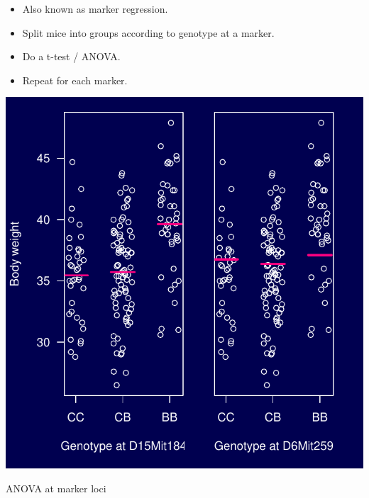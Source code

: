 \documentclass[12pt]{article}
\newcommand{\headsize}{\fontsize{35}{35} \selectfont}
\newcommand{\smallersize}{\fontsize{20}{25} \selectfont}
\begin{document}
\hspace*{0.5in}
\begin{minipage}[t]{4.1in}
\vspace*{5mm}

\sloppy
\smallersize
\begin{itemize}
\setlength{\rightskip}{0pt plus 1fil} %
\item Also known as {\color{mypink} marker regression}.
\item Split mice into groups according to genotype at a marker.
\item Do a t-test / ANOVA.
\item Repeat for each marker.
\end{itemize}
\end{minipage}
\hfill
\begin{minipage}[t]{5.3in}
\vspace*{0mm}

\includegraphics{FigsA/anova.pdf}
\end{minipage}







\newpage

\headsize \color{myyellow}
\hfill \begin{minipage}{5.75in}
\centering
ANOVA at marker loci
\end{minipage}
\end{document}
